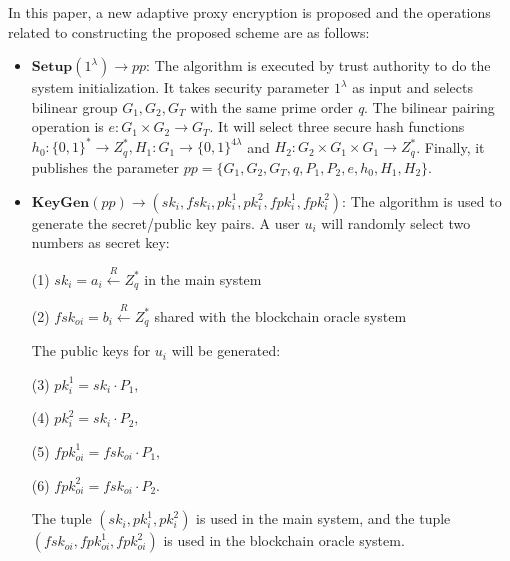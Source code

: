 \documentclass[journal]{IEEEtran}
\begin{document}
    In this paper, a new adaptive proxy encryption is proposed and the operations related to constructing the proposed scheme are as follows:

\begin{itemize}
    \item $ \boldsymbol{Setup}(1^\lambda) \to pp $: 
    The algorithm is executed by trust authority to do the system initialization. It takes security parameter $1^\lambda$ as input 
    and selects bilinear group ${G_1, G_2, G_T}$ with the same prime order \emph{q}. 
    The bilinear pairing operation is ${e:G_1\times G_2 \to G_T}$.
    It will select three secure hash functions $h_0:\{0,1\}^* \to Z_q^*, H_1: G_1 \to \{0,1\}^{4\lambda}$ and $H_2:G_2 \times G_1 \times G_1 \to Z_q^*$.
    Finally, it publishes the parameter $pp = \{G_1, G_2, G_T, q, P_1, P_2, e, h_0, H_1, H_2\}$.
    
    \item $ \boldsymbol{KeyGen}(pp) \to (sk_i, fsk_i, pk_i^1, pk_i^2, fpk_i^1, fpk_i^2) $: The algorithm is used to generate the secret/public key pairs. A user $u_i$ will randomly select two numbers as secret key:
    
    (1) $sk_i = a_i \xleftarrow{R} Z_q^*$ in the main system
    
    (2) $fsk_{oi} = b_i \xleftarrow{R} Z_q^*$ shared with the blockchain oracle system
    
    The public keys for $u_i$ will be generated: 
    
    (3) $pk_i^1 = sk_i \cdot P_1, $
    
    (4) $pk_i^2 = sk_i \cdot P_2, $
    
    (5) $fpk_{oi}^1 = fsk_{oi} \cdot P_1,$
    
    (6) $fpk_{oi}^2 = fsk_{oi} \cdot P_2$. 
    
    The tuple $(sk_i, pk_i^1, pk_i^2)$ is used in the main system, and the tuple $(fsk_{oi}, fpk_{oi}^1, fpk_{oi}^2)$ is used in the blockchain oracle system.
\end{itemize}
\end{document}
